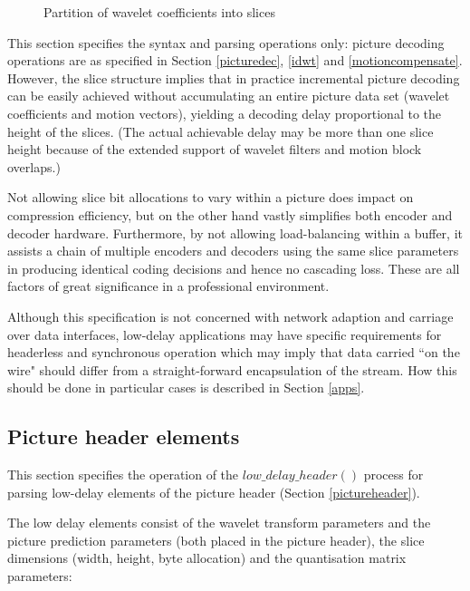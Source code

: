 \begin{figure}[!ht]
\centering
\caption{Partition of wavelet coefficients into slices}
\label{fig:waveletslice}
\end{figure}

This section specifies the syntax and parsing operations only: picture decoding operations are as
specified in Section \ref{picturedec}, \ref{idwt} and \ref{motioncompensate}. However, the slice
structure implies that in practice incremental picture decoding can be easily achieved without
accumulating an entire picture data set (wavelet coefficients and motion vectors), yielding a decoding delay
proportional to the height of the slices. (The actual achievable delay may be more than one slice height because
of the extended support of wavelet filters and motion block overlaps.)

\begin{informative}
Not allowing slice bit allocations to vary within a picture does impact on
compression efficiency, but on the other hand vastly simplifies both encoder and decoder hardware. Furthermore, by
not allowing load-balancing within a buffer, it assists a chain of multiple encoders and decoders using the same
slice parameters in producing identical coding decisions and hence no cascading loss. These are all factors of great 
significance in a professional environment.
\end{informative}

Although this specification is not concerned with network adaption and carriage over data interfaces, low-delay
applications may have specific requirements for headerless and synchronous operation which may imply that
data carried ``on the wire" should differ from a straight-forward encapsulation of the stream. How this should
be done in particular cases is described in Section \ref{apps}.

\subsection{Picture header elements}
\label{ldpictureheader}

This section specifies the operation of the $low\_delay\_header()$ process for parsing low-delay elements
of the picture header (Section \ref{pictureheader}).

The low delay elements consist of the wavelet transform parameters and the picture
prediction parameters (both placed in the picture header), the slice dimensions 
(width, height, byte allocation) and the quantisation matrix parameters:

